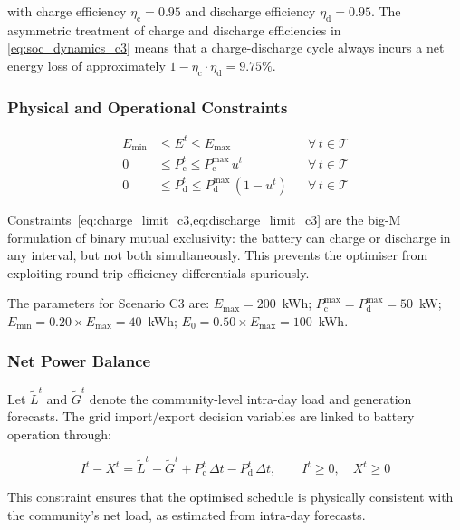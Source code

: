 \documentclass[12pt,a4paper]{article}
\begin{document}
with charge efficiency $\eta_{\mathrm{c}} = 0.95$ and discharge efficiency
$\eta_{\mathrm{d}} = 0.95$.  The asymmetric treatment of charge and discharge
efficiencies in \cref{eq:soc_dynamics_c3} means that a charge-discharge cycle
always incurs a net energy loss of approximately
$1 - \eta_{\mathrm{c}} \cdot \eta_{\mathrm{d}} = 9.75\%$.

\subsubsection{Physical and Operational Constraints}

\begin{align}
E_{\min} &\leq E^{t} \leq E_{\max}
&&\forall\, t \in \mathcal{T}
\label{eq:soc_bounds_c3}\\[4pt]
0 &\leq P_{\mathrm{c}}^{t} \leq P_{\mathrm{c}}^{\max}\,u^{t}
&&\forall\, t \in \mathcal{T}
\label{eq:charge_limit_c3}\\[4pt]
0 &\leq P_{\mathrm{d}}^{t} \leq P_{\mathrm{d}}^{\max}\,(1 - u^{t})
&&\forall\, t \in \mathcal{T}
\label{eq:discharge_limit_c3}
\end{align}

Constraints~\cref{eq:charge_limit_c3,eq:discharge_limit_c3} are the big-M
formulation of binary mutual exclusivity: the battery can charge or discharge
in any interval, but not both simultaneously.  This prevents the optimiser
from exploiting round-trip efficiency differentials spuriously.

The parameters for Scenario C3 are: $E_{\max} = 200$~kWh;
$P_{\mathrm{c}}^{\max} = P_{\mathrm{d}}^{\max} = 50$~kW;
$E_{\min} = 0.20 \times E_{\max} = 40$~kWh; $E_{0} = 0.50 \times E_{\max} = 100$~kWh.

\subsubsection{Net Power Balance}

Let $\tilde{L}^{t}$ and $\tilde{G}^{t}$ denote the community-level intra-day
load and generation forecasts.  The grid import/export decision variables are
linked to battery operation through:

\begin{equation}
I^{t} - X^{t}
  = \tilde{L}^{t} - \tilde{G}^{t}
    + P_{\mathrm{c}}^{t}\,\Delta t - P_{\mathrm{d}}^{t}\,\Delta t,
\qquad I^{t} \geq 0,\quad X^{t} \geq 0
\label{eq:grid_balance_c3}
\end{equation}

This constraint ensures that the optimised schedule is physically consistent
with the community's net load, as estimated from intra-day forecasts.
\end{document}
